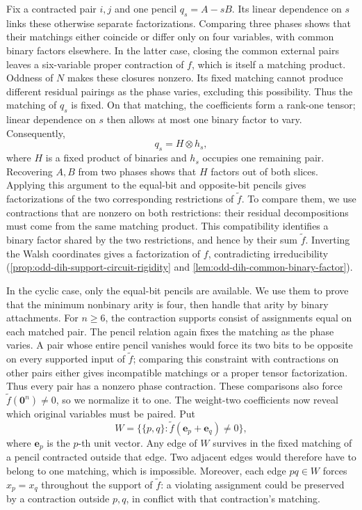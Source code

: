 \documentclass[11pt,letterpaper,onecolumn]{article}
\theoremstyle{plain}
\theoremstyle{definition}
\theoremstyle{remark}
\newcommand{\zero}{\mathbf 0}
\begin{document}
Fix a contracted pair \(i,j\) and one pencil \(q_s=A-sB\). Its linear
dependence on \(s\) links these otherwise separate factorizations.
Comparing three phases shows that their matchings either coincide or
differ only on four variables, with common binary factors elsewhere.
In the latter case, closing the common external pairs leaves a
six-variable proper contraction of \(f\), which is itself a matching
product. Oddness of \(N\) makes these closures nonzero. Its fixed
matching cannot produce different residual pairings as the phase varies,
excluding this possibility. Thus the matching of \(q_s\) is fixed.
On that matching, the coefficients form a rank-one tensor; linear
dependence on \(s\) then allows at most one binary factor to vary.
Consequently,
\[
q_s=H\otimes h_s,
\]
where \(H\) is a fixed product of binaries and \(h_s\) occupies one
remaining pair. Recovering \(A,B\) from two phases shows that \(H\)
factors out of both slices. Applying this argument to the equal-bit and
opposite-bit pencils gives factorizations of the two corresponding
restrictions of \(\widetilde f\). To compare them, we use contractions
that are nonzero on both restrictions: their residual decompositions
must come from the same matching product. This compatibility identifies
a binary factor shared by the two restrictions, and hence by their sum
\(\widetilde f\). Inverting the Walsh coordinates gives a factorization
of \(f\), contradicting irreducibility (\cref{prop:odd-dih-support-circuit-rigidity} and
\cref{lem:odd-dih-common-binary-factor}).

In the cyclic case, only the equal-bit pencils are available. We use them
to prove that the minimum nonbinary arity is four, then handle that
arity by binary attachments. For \(n\ge6\), the contraction supports
consist of assignments equal on each matched pair. The pencil relation
again fixes the matching as the phase varies. A pair whose entire pencil
vanishes would force its two bits to be opposite on every supported input
of \(\widetilde f\); comparing this constraint with contractions on other
pairs either gives incompatible matchings or a proper tensor
factorization. Thus every pair has a nonzero phase contraction. These
comparisons also force \(\widetilde f(\zero^n)\ne0\), so we normalize it
to one. The weight-two coefficients now reveal which original variables
must be paired. Put
\[
W=\{\{p,q\}:\widetilde f(\mathbf e_p+\mathbf e_q)\ne0\},
\]
where \(\mathbf e_p\) is the \(p\)-th unit vector. Any edge of \(W\)
survives in the fixed matching of a pencil contracted outside that edge.
Two adjacent edges would therefore have to belong to one matching,
which is impossible. Moreover, each edge \(pq\in W\) forces
\(x_p=x_q\) throughout the support of \(\widetilde f\): a violating
assignment could be preserved by a contraction outside \(p,q\), in
conflict with that contraction's matching.
\end{document}

